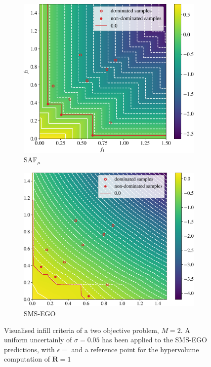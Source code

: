 \documentclass[conference]{IEEEtran}
\newcommand{\nobj}{M}
\newcommand{\rp}{\mathbf{R}}
\newcommand\safmu{SAF$_{\mu}$\xspace}
\newcommand\smsego{SMS-EGO\xspace}
\begin{document}
\begin{figure}[t]
\begin{subfigure}[t]{0.45\columnwidth}
    \includegraphics[width=\columnwidth]{figures/_objective_space_SAF_mu.pdf}
    \caption{\safmu}
    \label{fig: saf_obj_space}
\end{subfigure}
\begin{subfigure}[t]{0.45\columnwidth}
    \includegraphics[width=\columnwidth]{figures/_objective_space_SMS_ei.pdf}
    \caption{\smsego}
    \label{fig: smsego_obj_space}
\end{subfigure}
\caption{Visualised infill criteria of a two objective problem, $\nobj=2$. A uniform uncertainly of $\sigma=0.05$ has been applied to the \smsego predictions, with $\epsilon=$ and a reference point for the hypervolume computation of $\rp=1$}
\label{fig: obj_space_comp}
\end{figure}
\end{document}
